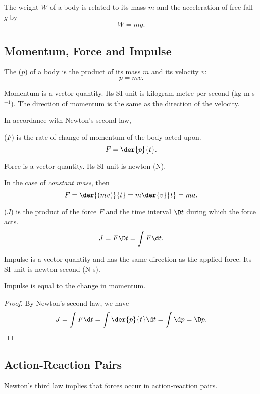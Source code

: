 The weight $W$ of a body is related to its mass $m$ and the acceleration of free fall $g$ by \[W = mg.\]

\subsection{Momentum, Force and Impulse}

\begin{definition}
    The  ($p$) of a body is the product of its mass $m$ and its velocity $v$: \[p = mv.\]
\end{definition}

Momentum is a vector quantity. Its SI unit is kilogram-metre per second (kg m s$^{-1}$). The direction of momentum is the same as the direction of the velocity.

In accordance with Newton's second law,

\begin{definition}
     ($F$) is the rate of change of momentum of the body acted upon. \[F = \der{p}{t}.\]
\end{definition}

Force is a vector quantity. Its SI unit is newton (N).

In the case of \emph{constant mass}, then \[F = \der{(mv)}{t} = m \der{v}{t} = ma.\]

\begin{definition}
     ($J$) is the product of the force $F$ and the time interval $\D t$ during which the force acts. \[J = F \D t = \int F \d t.\]
\end{definition}

Impulse is a vector quantity and has the same direction as the applied force. Its SI unit is newton-second (N s).

\begin{theorem}
    Impulse is equal to the change in momentum.
\end{theorem}
\begin{proof}
    By Newton's second law, we have \[J = \int F \d t = \int \der{p}{t} \d t = \int \d p = \D p.\]
\end{proof}

\subsection{Action-Reaction Pairs}

Newton's third law implies that forces occur in action-reaction pairs.

